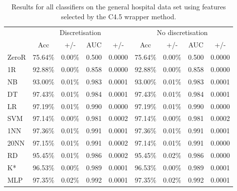 \begin{table}[htbp]
\caption{Results for all classifiers on the general hospital data set using features selected by the C4.5 wrapper method.}
\begin{tabular}{|l|cccc|cccc|}
\hline
 & \multicolumn{ 4}{c|}{Discretisation} & \multicolumn{ 4}{c|}{No discretisation} \\ 
 & Acc & +/- & AUC & +/- & Acc & +/- & AUC & +/- \\ \hline
  ZeroR & 75.64\% & 0.00\% & 0.500 & 0.0000 & 75.64\% & 0.00\% & 0.500 & 0.0000 \\ 
  1R & 92.88\% & 0.00\% & 0.858 & 0.0000 & 92.88\% & 0.00\% & 0.858 & 0.0000 \\ 
  NB & 93.00\% & 0.01\% & 0.983 & 0.0001 & 93.00\% & 0.01\% & 0.983 & 0.0001 \\ 
  DT & 97.43\% & 0.01\% & 0.984 & 0.0001 & 97.43\% & 0.01\% & 0.984 & 0.0001 \\ 
  LR & 97.19\% & 0.01\% & 0.990 & 0.0000 & 97.19\% & 0.01\% & 0.990 & 0.0000 \\ 
  SVM & 97.14\% & 0.00\% & 0.981 & 0.0002 & 97.14\% & 0.00\% & 0.981 & 0.0002 \\ 
  1NN & 97.36\% & 0.01\% & 0.991 & 0.0001 & 97.36\% & 0.01\% & 0.991 & 0.0001 \\ 
  20NN & 97.15\% & 0.01\% & 0.991 & 0.0002 & 97.14\% & 0.01\% & 0.991 & 0.0000 \\ 
  RD & 95.45\% & 0.01\% & 0.986 & 0.0002 & 95.45\% & 0.02\% & 0.986 & 0.0000 \\ 
  K* & 96.53\% & 0.00\% & 0.989 & 0.0001 & 96.53\% & 0.00\% & 0.989 & 0.0001 \\ 
  MLP & 97.35\% & 0.02\% & 0.992 & 0.0001 & 97.35\% & 0.02\% & 0.992 & 0.0001 \\ \hline
\end{tabular}
\end{table}
